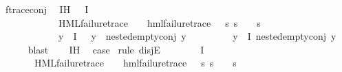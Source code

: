 \begin{isabellebody}
\ f{\isacharunderscore}{\kern0pt}trace{\isacharunderscore}{\kern0pt}conj\ \isamarkupfalse%
\ IH{\isacharcolon}{\kern0pt}\ {\isachardoublequoteopen}{\isacharparenleft}{\kern0pt}{\isacharparenleft}{\kern0pt}{\isasymexists}{\isasympsi}{\isasymin}{\isasymPhi}\ {\isacharbackquote}{\kern0pt}\ I{\isachardot}{\kern0pt}\isanewline
\ \ \ \ \ \ \ \ \ \ \ \ {\isacharparenleft}{\kern0pt}HML{\isacharunderscore}{\kern0pt}failure{\isacharunderscore}{\kern0pt}trace\ {\isasympsi}\ {\isasymand}\ {\isacharparenleft}{\kern0pt}{\isasymexists}{\isasympsi}{\isacharprime}{\kern0pt}{\isachardot}{\kern0pt}\ hml{\isacharunderscore}{\kern0pt}failure{\isacharunderscore}{\kern0pt}trace\ {\isasympsi}{\isacharprime}{\kern0pt}\ {\isasymand}\ {\isacharparenleft}{\kern0pt}{\isasymforall}s{\isachardot}{\kern0pt}\ {\isacharparenleft}{\kern0pt}s\ {\isasymTurnstile}\ {\isasympsi}{\isacharparenright}{\kern0pt}\ {\isacharequal}{\kern0pt}\ {\isacharparenleft}{\kern0pt}s\ {\isasymTurnstile}\ {\isasympsi}{\isacharprime}{\kern0pt}{\isacharparenright}{\kern0pt}{\isacharparenright}{\kern0pt}{\isacharparenright}{\kern0pt}{\isacharparenright}{\kern0pt}\ {\isasymand}\isanewline
\ \ \ \ \ \ \ \ \ \ \ \ {\isacharparenleft}{\kern0pt}{\isasymforall}y{\isasymin}{\isasymPhi}\ {\isacharbackquote}{\kern0pt}\ I{\isachardot}{\kern0pt}\ {\isasympsi}\ {\isasymnoteq}\ y\ {\isasymlongrightarrow}\ nested{\isacharunderscore}{\kern0pt}empty{\isacharunderscore}{\kern0pt}conj\ y{\isacharparenright}{\kern0pt}{\isacharparenright}{\kern0pt}\ {\isasymor}\isanewline
\ \ \ \ \ \ \ \ {\isacharparenleft}{\kern0pt}{\isasymforall}y{\isasymin}{\isasymPhi}\ {\isacharbackquote}{\kern0pt}\ I{\isachardot}{\kern0pt}\ nested{\isacharunderscore}{\kern0pt}empty{\isacharunderscore}{\kern0pt}conj\ y{\isacharparenright}{\kern0pt}{\isacharparenright}{\kern0pt}{\isachardoublequoteclose}\ \isanewline
\ \ \ \ \isamarkupfalse%
\ blast\isanewline
\ \ \isamarkupfalse%
\ IH\ \isamarkupfalse%
\ {\isacharquery}{\kern0pt}case\ \isamarkupfalse%
{\isacharparenleft}{\kern0pt}rule\ disjE{\isacharparenright}{\kern0pt}\isanewline
\ \ \ \ \isamarkupfalse%
\ {\isachardoublequoteopen}{\isasymexists}{\isasympsi}{\isasymin}{\isasymPhi}\ {\isacharbackquote}{\kern0pt}\ I{\isachardot}{\kern0pt}\isanewline
\ \ \ \ \ \ \ {\isacharparenleft}{\kern0pt}HML{\isacharunderscore}{\kern0pt}failure{\isacharunderscore}{\kern0pt}trace\ {\isasympsi}\ {\isasymand}\ {\isacharparenleft}{\kern0pt}{\isasymexists}{\isasympsi}{\isacharprime}{\kern0pt}{\isachardot}{\kern0pt}\ hml{\isacharunderscore}{\kern0pt}failure{\isacharunderscore}{\kern0pt}trace\ {\isasympsi}{\isacharprime}{\kern0pt}\ {\isasymand}\ {\isacharparenleft}{\kern0pt}{\isasymforall}s{\isachardot}{\kern0pt}\ {\isacharparenleft}{\kern0pt}s\ {\isasymTurnstile}\ {\isasympsi}{\isacharparenright}{\kern0pt}\ {\isacharequal}{\kern0pt}\ {\isacharparenleft}{\kern0pt}s\ {\isasymTurnstile}\ {\isasympsi}{\isacharprime}{\kern0pt}{\isacharparenright}{\kern0pt}{\isacharparenright}{\kern0pt}{\isacharparenright}{\kern0pt}{\isacharparenright}{\kern0pt}\ {\isasymand}\isanewline

\end{isabellebody}
